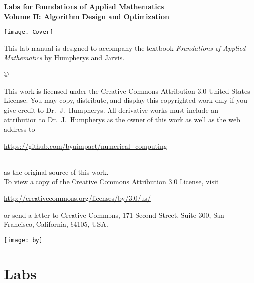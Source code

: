 \documentclass[nociteref]{SIAM-GH-book}
\begin{document}
\thispagestyle{empty}

\begin{center}
{\huge \bf Labs for Foundations of Applied Mathematics} \\
\vspace{5mm}
{\Large \bf Volume II: Algorithm
Design and Optimization}
\vspace{20mm}

\texttt{[image: Cover]}
\end{center}
\frontmatter




\begin{thepreface}
This lab manual is designed to accompany the textbook \emph{Foundations of Applied Mathematics} by Humpherys and Jarvis.

\vfill
\copyright{This work is licensed under the Creative Commons Attribution 3.0 United States
License.  You may copy, distribute, and display this copyrighted work only if you give
credit to Dr.~J.~Humpherys. All derivative works must include an attribution to Dr.~J.~Humpherys as the owner of this work as well as the web address to
\\\centerline{\url{https://github.com/byuimpact/numerical_computing}}\\ as the original source of
this
work.\\To view a copy of the Creative Commons Attribution 3.0 License,
visit\\\centerline{\url{http://creativecommons.org/licenses/by/3.0/us/}} or send a letter to
Creative Commons, 171 Second Street, Suite 300, San Francisco, California, 94105, USA.}

\vfill
\centering\texttt{[image: by]}
\vfill
\end{thepreface}

\setcounter{tocdepth}{1}
\tableofcontents

\mainmatter

\part{Labs}

\end{document}
